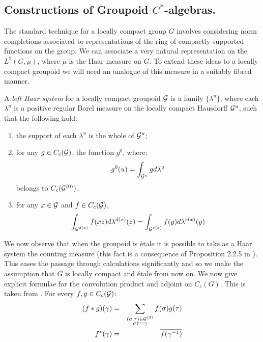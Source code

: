 \subsection{Constructions of Groupoid \texorpdfstring{$C^{*}$}{C*}-algebras.}\label{Sect:GVC} The standard technique for a locally compact group $G$ involves considering norm completions associated to representations of the ring of compactly supported functions on the group. We can associate a very natural representation on the $L^{2}(G,\mu)$, where $\mu$ is the Haar measure on $G$. To extend these ideas to a locally compact groupoid we will need an analogue of this measure in a suitably fibred manner.

\begin{definition}
A \textit{left Haar system} for a locally compact groupoid $\mathcal{G}$ is a family $\lbrace \lambda^{u} \rbrace$, where each $\lambda^{u}$ is a positive regular Borel measure on the locally compact Hausdorff $\mathcal{G}^{u}$, such that the following hold:
\begin{enumerate}
\item the support of each $\lambda^{u}$ is the whole of $\mathcal{G}^{u}$;
\item for any $g \in C_{c}(\mathcal{G})$, the function $g^{0}$, where:
\begin{equation*}
g^{0}(u)=\int_{\mathcal{G}^{u}}g d\lambda^{u}
\end{equation*}
belongs to $C_{c}(\mathcal{G}^{(0)})$.
\item for any $x \in \mathcal{G}$ and $f \in C_{c}(\mathcal{G})$,
\begin{equation*}
\int_{\mathcal{G}^{d(x)}}f(xz)d\lambda^{d(x)}(z) = \int_{\mathcal{G}^{r(x)}}f(y)d\lambda^{r(x)}(y)
\end{equation*}
\end{enumerate}
\end{definition}

We now observe that when the groupoid is \'etale it is possible to take as a Haar system the counting measure (this fact is a consequence of Proposition 2.2.5  in \cite{MR1724106}). This eases the passage through calculations significantly and so we make the assumption that $G$ is locally compact and \'etale from now on. We now give explicit formulae for the convolution product and adjoint on $C_{c}(G)$. This is taken from \cite{MR2419901}. For every $f,g \in C_{c}(\mathcal{G})$:
\begin{eqnarray*}
(f \ast g)(\gamma) & = & \sum_{\substack{(\sigma,\tau) \in \mathcal{G}^{(2)}\\ \sigma\tau=\gamma}}f(\sigma)g(\tau)\\
f^{*}(\gamma) & = & \overline{f(\gamma^{-1})} 
\end{eqnarray*}

